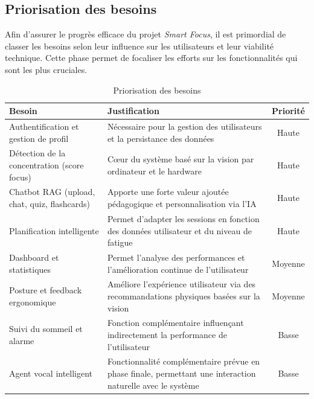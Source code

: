 \subsection{Priorisation des besoins}

Afin d'assurer le progrès efficace du projet \textit{Smart Focus}, il est primordial de classer les besoins selon leur influence sur les utilisateurs et leur viabilité technique. Cette phase permet de focaliser les efforts sur les fonctionnalités qui sont les plus cruciales.

\vspace{0.5em}
\begin{table}[H]
    \centering
    \renewcommand{\arraystretch}{1.3}
    
    \begin{tabular}{|p{5cm}|p{6.5cm}|c|}
        \hline
        \textbf{Besoin} & \textbf{Justification} & \textbf{Priorité} \\ \hline
        
        Authentification et gestion de profil 
        & Nécessaire pour la gestion des utilisateurs et la persistance des données 
        & Haute \\ \hline
        
        Détection de la concentration (score focus) 
        & Cœur du système basé sur la vision par ordinateur et le hardware 
        & Haute \\ \hline
        
        Chatbot \ac{RAG} (upload, chat, quiz, flashcards) 
        & Apporte une forte valeur ajoutée pédagogique et personnalisation via l’IA 
        & Haute \\ \hline
        
        Planification intelligente 
        & Permet d’adapter les sessions en fonction des données utilisateur et du niveau de fatigue 
        & Haute \\ \hline
        
        Dashboard et statistiques 
        & Permet l’analyse des performances et l’amélioration continue de l’utilisateur 
        & Moyenne \\ \hline
        
        Posture et feedback ergonomique 
        & Améliore l’expérience utilisateur via des recommandations physiques basées sur la vision 
        & Moyenne \\ \hline
        
        Suivi du sommeil et alarme 
        & Fonction complémentaire influençant indirectement la performance de l’utilisateur 
        & Basse \\ \hline
        
        Agent vocal intelligent
        & Fonctionnalité complémentaire prévue en phase finale, permettant une interaction naturelle avec le système
        & Basse \\ \hline
        
    \end{tabular}

    \caption{Priorisation des besoins}
    \label{tab:priorisation_besoins}
\end{table}


